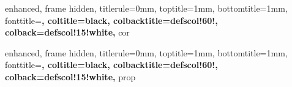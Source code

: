 

\newenvironment{lemp}{
	{\noindent{\it \textbf{Demostración.}}}
	\tcolorbox[blanker,breakable,left=5mm,parbox=false,
	before upper={\parindent15pt},
	after skip=10pt,
	borderline west={1mm}{0pt}{lemscol!40!white}]
}{
	\textcolor{lemscol!40!white}{\hbox{}\nobreak\hfill$\blacksquare$} 
	\endtcolorbox
}




{
	enhanced,
	frame hidden,
	titlerule=0mm,
	toptitle=1mm,
	bottomtitle=1mm,
	fonttitle=\bfseries\large,
	coltitle=black,
	colbacktitle=defscol!60!,
	colback=defscol!15!white,
}{cor}




\newenvironment{corp}{
	{\noindent{\it \textbf{Demostración.}}}
	\tcolorbox[blanker,breakable,left=5mm,parbox=false,
	before upper={\parindent15pt},
	after skip=10pt,
	borderline west={1mm}{0pt}{corscol!40!white}]
}{
	\textcolor{corscol!40!white}{\hbox{}\nobreak\hfill$\blacksquare$} 
	\endtcolorbox
}

{
	enhanced,
	frame hidden,
	titlerule=0mm,
	toptitle=1mm,
	bottomtitle=1mm,
	fonttitle=\bfseries\large,
	coltitle=black,
	colbacktitle=defscol!60!,
	colback=defscol!15!white,
}{prop}



